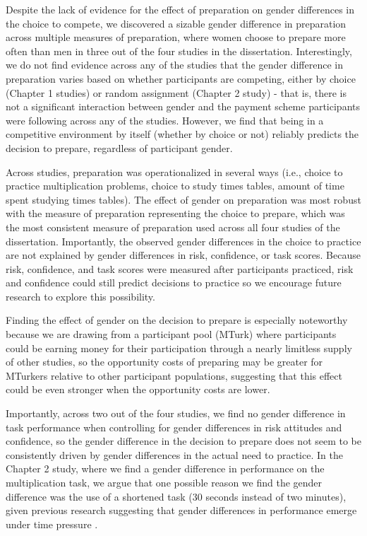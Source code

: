 \documentclass[letterpaper, nobind]{templates/ociamthesis}
\begin{document}
Despite the lack of evidence for the effect of preparation on gender differences in the choice to compete, we discovered a sizable gender difference in preparation across multiple measures of preparation, where women choose to prepare more often than men in three out of the four studies in the dissertation. Interestingly, we do not find evidence across any of the studies that the gender difference in preparation varies based on whether participants are competing, either by choice (Chapter 1 studies) or random assignment (Chapter 2 study) - that is, there is not a significant interaction between gender and the payment scheme participants were following across any of the studies. However, we find that being in a competitive environment by itself (whether by choice or not) reliably predicts the decision to prepare, regardless of participant gender.

Across studies, preparation was operationalized in several ways (i.e., choice to practice multiplication problems, choice to study times tables, amount of time spent studying times tables). The effect of gender on preparation was most robust with the measure of preparation representing the choice to prepare, which was the most consistent measure of preparation used across all four studies of the dissertation. Importantly, the observed gender differences in the choice to practice are not explained by gender differences in risk, confidence, or task scores. Because risk, confidence, and task scores were measured after participants practiced, risk and confidence could still predict decisions to practice so we encourage future research to explore this possibility.

Finding the effect of gender on the decision to prepare is especially noteworthy because we are drawing from a participant pool (MTurk) where participants could be earning money for their participation through a nearly limitless supply of other studies, so the opportunity costs of preparing may be greater for MTurkers relative to other participant populations, suggesting that this effect could be even stronger when the opportunity costs are lower.

Importantly, across two out of the four studies, we find no gender difference in task performance when controlling for gender differences in risk attitudes and confidence, so the gender difference in the decision to prepare does not seem to be consistently driven by gender differences in the actual need to practice. In the Chapter 2 study, where we find a gender difference in performance on the multiplication task, we argue that one possible reason we find the gender difference was the use of a shortened task (30 seconds instead of two minutes), given previous research suggesting that gender differences in performance emerge under time pressure \autocite{Shurchkov2012}.
\end{document}
